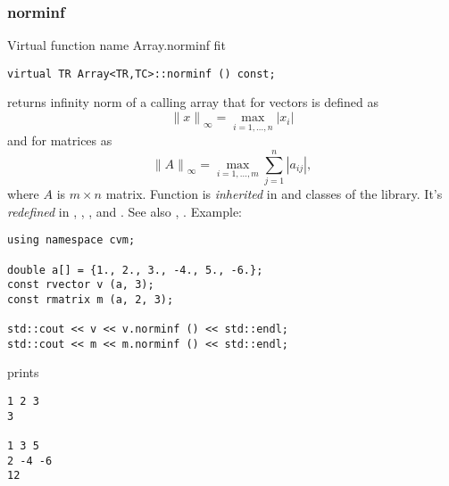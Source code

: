 \subsubsection{norminf}
Virtual function%
\pdfdest name {Array.norminf} fit
\begin{verbatim}
virtual TR Array<TR,TC>::norminf () const;
\end{verbatim}
returns  infinity norm of a calling array that for vectors
is defined as
\begin{equation*}
{\|x\|}_\infty=\max_{i=1,\dots,n} |x_i|
\end{equation*}
and for matrices as
\begin{equation*}
{\|A\|}_\infty=\max_{i=1,\dots,m} \sum_{j=1}^{n} |a_{ij}|,
\end{equation*}
where $A$ is $m\times n$ matrix.
Function is \emph{inherited}
in
 and   
classes of the library.
It's \emph{redefined} in ,
, ,
 and .
See also , .
Example:
\begin{Verbatim}
using namespace cvm;

double a[] = {1., 2., 3., -4., 5., -6.};
const rvector v (a, 3);
const rmatrix m (a, 2, 3);

std::cout << v << v.norminf () << std::endl;
std::cout << m << m.norminf () << std::endl;
\end{Verbatim}
prints
\begin{Verbatim}
1 2 3
3

1 3 5
2 -4 -6
12
\end{Verbatim}
\newpage



